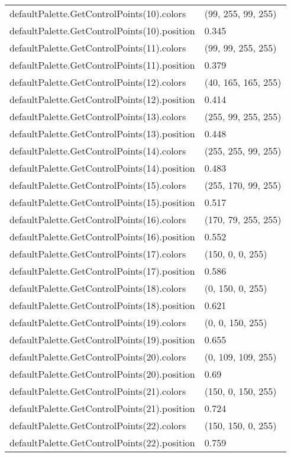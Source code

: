 \documentclass[10pt,a4paper]{report}
\begin{document}
\begin{longtable}{lp{7.5cm}}
defaultPalette.GetControlPoints(10).colors  &  (99, 255, 99, 255) \\
defaultPalette.GetControlPoints(10).position  &  0.345 \\
defaultPalette.GetControlPoints(11).colors  &  (99, 99, 255, 255) \\
defaultPalette.GetControlPoints(11).position  &  0.379 \\
defaultPalette.GetControlPoints(12).colors  &  (40, 165, 165, 255) \\
defaultPalette.GetControlPoints(12).position  &  0.414 \\
defaultPalette.GetControlPoints(13).colors  &  (255, 99, 255, 255) \\
defaultPalette.GetControlPoints(13).position  &  0.448 \\
defaultPalette.GetControlPoints(14).colors  &  (255, 255, 99, 255) \\
defaultPalette.GetControlPoints(14).position  &  0.483 \\
defaultPalette.GetControlPoints(15).colors  &  (255, 170, 99, 255) \\
defaultPalette.GetControlPoints(15).position  &  0.517 \\
defaultPalette.GetControlPoints(16).colors  &  (170, 79, 255, 255) \\
defaultPalette.GetControlPoints(16).position  &  0.552 \\
defaultPalette.GetControlPoints(17).colors  &  (150, 0, 0, 255) \\
defaultPalette.GetControlPoints(17).position  &  0.586 \\
defaultPalette.GetControlPoints(18).colors  &  (0, 150, 0, 255) \\
defaultPalette.GetControlPoints(18).position  &  0.621 \\
defaultPalette.GetControlPoints(19).colors  &  (0, 0, 150, 255) \\
defaultPalette.GetControlPoints(19).position  &  0.655 \\
defaultPalette.GetControlPoints(20).colors  &  (0, 109, 109, 255) \\
defaultPalette.GetControlPoints(20).position  &  0.69 \\
defaultPalette.GetControlPoints(21).colors  &  (150, 0, 150, 255) \\
defaultPalette.GetControlPoints(21).position  &  0.724 \\
defaultPalette.GetControlPoints(22).colors  &  (150, 150, 0, 255) \\
defaultPalette.GetControlPoints(22).position  &  0.759 \\

\end{longtable}
\end{document}
